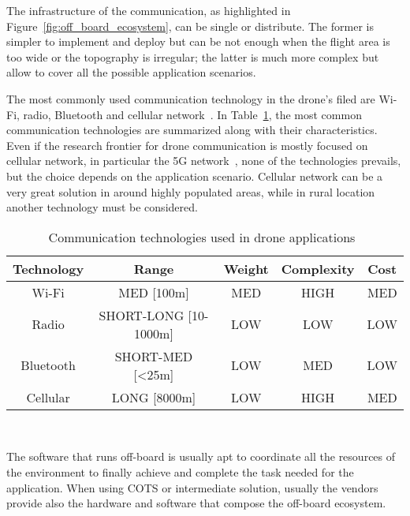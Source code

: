 The infrastructure of the communication, as highlighted in Figure~\ref{fig:off_board_ecosystem}, can be single or distribute.
The former is simpler to implement and deploy but can be not enough when the flight area is too wide or the topography is irregular; the latter is 
much more complex but allow to cover all the possible application scenarios.

The most commonly used communication technology in the drone's filed are Wi-Fi, radio, Bluetooth and cellular network~\cite{pantelimon2019surveyCommunication}. 
In Table~\ref{table:communication_technologies}, the most common communication technologies are summarized along with their characteristics.
Even if the research frontier for drone communication is mostly focused on cellular network, in particular the 5G network~\cite{sharma2020communication},
none of the technologies prevails, but the choice depends on the application scenario. 
Cellular network can be a very great solution in around highly populated areas, while in rural location another technology must be considered.


\begin{table}[H]
    \centering
        \begin{tabular}{|c|c|c|c|c|}
        \hline
        \rowcolor{bluepoli!40}
        \textbf{Technology} & \textbf{Range} & \textbf{Weight} & \textbf{Complexity} & \textbf{Cost} \\
        \hline \hline
        Wi-Fi & MED [100m] & MED & HIGH & MED \\
        \hline
        Radio & SHORT-LONG [10-1000m] & LOW & LOW & LOW \\
        \hline
        Bluetooth & SHORT-MED [<25m] & LOW & MED & LOW \\
        \hline
        Cellular & LONG [8000m] & LOW & HIGH & MED \\
        \hline
        \end{tabular}
        \\[10pt]
        \caption[Communication technologies]{Communication technologies used in drone applications~\cite{pantelimon2019surveyCommunication}}\label{table:communication_technologies}
    \end{table}

The software that runs off-board is usually apt to coordinate all the resources of the environment to finally achieve and 
complete the task needed for the application. When using COTS or intermediate solution, usually the vendors provide also the 
hardware and software that compose the off-board ecosystem.

